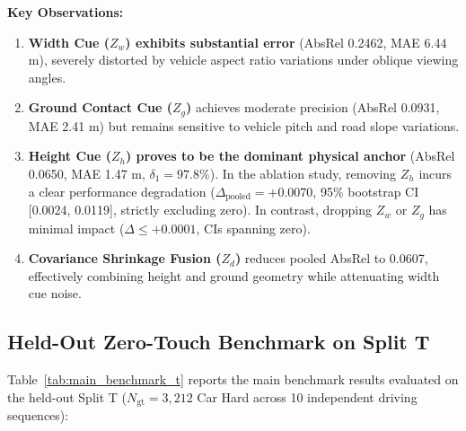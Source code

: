 \documentclass[]{spie}  %
\begin{document}
\textbf{Key Observations:}
\begin{enumerate}
    \item \textbf{Width Cue ($Z_w$) exhibits substantial error} (AbsRel 0.2462, MAE 6.44 m), severely distorted by vehicle aspect ratio variations under oblique viewing angles.
    \item \textbf{Ground Contact Cue ($Z_g$)} achieves moderate precision (AbsRel 0.0931, MAE 2.41 m) but remains sensitive to vehicle pitch and road slope variations.
    \item \textbf{Height Cue ($Z_h$) proves to be the dominant physical anchor} (AbsRel 0.0650, MAE 1.47 m, $\delta_1 = 97.8\%$). In the ablation study, removing $Z_h$ incurs a clear performance degradation ($\Delta_{\text{pooled}} = +0.0070$, 95\% bootstrap CI [0.0024, 0.0119], strictly excluding zero). In contrast, dropping $Z_w$ or $Z_g$ has minimal impact ($\Delta \le +0.0001$, CIs spanning zero).
    \item \textbf{Covariance Shrinkage Fusion ($Z_d$)} reduces pooled AbsRel to 0.0607, effectively combining height and ground geometry while attenuating width cue noise.
\end{enumerate}

\subsection{Held-Out Zero-Touch Benchmark on Split T}
Table~\ref{tab:main_benchmark_t} reports the main benchmark results evaluated on the held-out Split T ($N_{\text{gt}} = 3,212$ Car Hard across 10 independent driving sequences):
\end{document}
